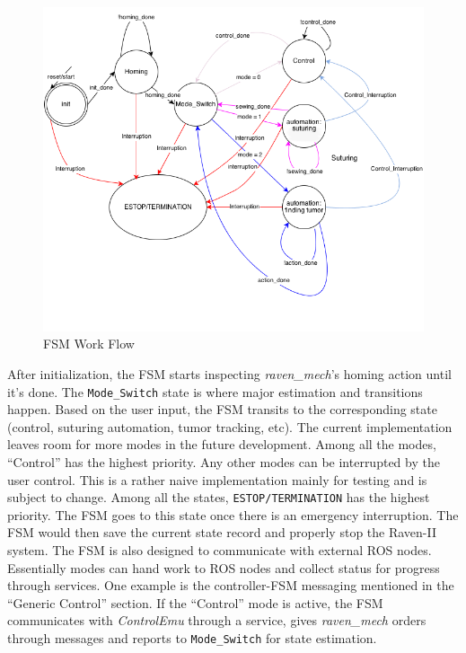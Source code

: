 \documentclass[letterpaper,twocolumn,10pt]{article}
\begin{document}
\begin{figure}[h]
  \includegraphics[scale=0.4]{FSM.png}
  \caption{FSM Work Flow}
  \label{fig:fsm_workflow}
\end{figure}

After initialization, the FSM starts inspecting \emph{raven\_mech}'s
homing action until it's done. The \texttt{Mode\_Switch} state is
where major estimation and transitions happen. Based on the user
input, the FSM transits to the corresponding state (control, suturing
automation, tumor tracking, etc). The current implementation leaves
room for more modes in the future development. Among all the modes,
``Control'' has the highest priority. Any other modes can be
interrupted by the user control. This is a rather naive implementation
mainly for testing and is subject to change. Among all the states,
\texttt{ESTOP/TERMINATION} has the highest priority. The FSM goes to
this state once there is an emergency interruption. The FSM would then
save the current state record and properly stop the Raven-II
system. The FSM is also designed to communicate with external ROS
nodes. Essentially modes can hand work to ROS nodes and collect status
for progress through services. One example is the controller-FSM
messaging mentioned in the ``Generic Control'' section. If the
``Control'' mode is active, the FSM communicates with
\emph{ControlEmu} through a service, gives \emph{raven\_mech} orders
through messages and reports to \texttt{Mode\_Switch} for state
estimation.
\end{document}

